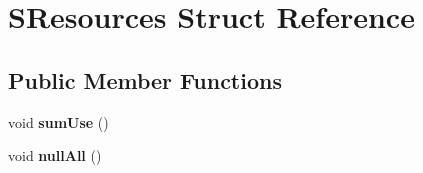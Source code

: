 \hypertarget{structSResources}{\section{S\-Resources Struct Reference}
\label{structSResources}
}
\subsection*{Public Member Functions}
\begin{DoxyCompactItemize}
\item 
\hypertarget{structSResources_ac68b3d496f0c7fb190824f0502eab6ff}{void {\bfseries sum\-Use} ()}\label{structSResources_ac68b3d496f0c7fb190824f0502eab6ff}

\item 
\hypertarget{structSResources_abd709d3a612a758bbd771099ce257bf0}{void {\bfseries null\-All} ()}\label{structSResources_abd709d3a612a758bbd771099ce257bf0}

\end{DoxyCompactItemize}

